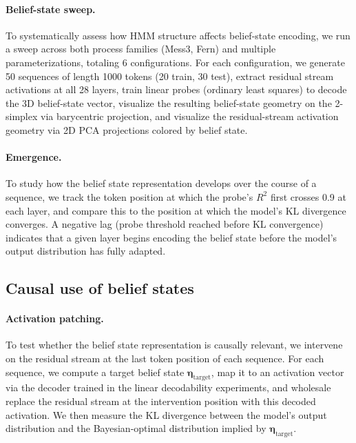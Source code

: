 \documentclass[midterm]{sparreport}
\begin{document}
\paragraph{Belief-state sweep.}
To systematically assess how HMM structure affects belief-state encoding, we run a sweep across both process families (Mess3, Fern) and multiple parameterizations, totaling 6 configurations. For each configuration, we generate 50 sequences of length 1000 tokens (20 train, 30 test), extract residual stream activations at all 28 layers, train linear probes (ordinary least squares) to decode the 3D belief-state vector, visualize the resulting belief-state geometry on the 2-simplex via barycentric projection, and visualize the residual-stream activation geometry via 2D PCA projections colored by belief state.

\paragraph{Emergence.}
To study how the belief state representation develops over the course of a sequence, we track the token position at which the probe's $R^2$ first crosses 0.9 at each layer, and compare this to the position at which the model's KL divergence converges. A negative lag (probe threshold reached before KL convergence) indicates that a given layer begins encoding the belief state before the model's output distribution has fully adapted.

\subsection{Causal use of belief states}

\paragraph{Activation patching.}
To test whether the belief state representation is causally relevant, we intervene on the residual stream at the last token position of each sequence. For each sequence, we compute a target belief state $\boldsymbol{\eta}_{\mathrm{target}}$, map it to an activation vector via the decoder trained in the linear decodability experiments, and wholesale replace the residual stream at the intervention position with this decoded activation. We then measure the KL divergence between the model's output distribution and the Bayesian-optimal distribution implied by $\boldsymbol{\eta}_{\mathrm{target}}$.
\end{document}
